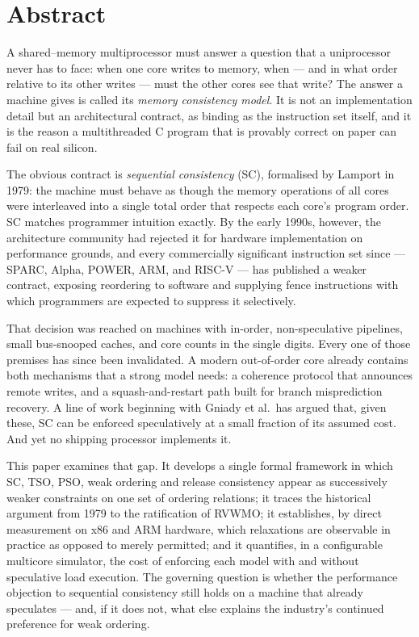 \chapter*{Abstract}

A shared--memory multiprocessor must answer a question that a uniprocessor never
has to face: when one core writes to memory, when --- and in what order relative
to its other writes --- must the other cores see that write?
The answer a machine
gives is called its \emph{memory consistency model}.
It is not an implementation
detail but an architectural contract, as binding as the instruction set itself,
and it is the reason a multithreaded C program that is provably correct on paper
can fail on real silicon.

The obvious contract is \emph{sequential consistency} (SC), formalised by Lamport
in 1979: the machine must behave as though the memory operations of all cores were
interleaved into a single total order that respects each core's program order.
SC matches programmer intuition exactly.
By the early 1990s, however, the
architecture community had rejected it for hardware implementation on performance
grounds, and every commercially significant instruction set since --- SPARC, Alpha,
POWER, ARM, and RISC-V --- has published a weaker contract, exposing reordering to
software and supplying fence instructions with which programmers are expected to
suppress it selectively.

That decision was reached on machines with in-order, non-speculative pipelines,
small bus-snooped caches, and core counts in the single digits.
Every one of those
premises has since been invalidated. A modern out-of-order core already contains
both mechanisms that a strong model needs: a coherence protocol that announces
remote writes, and a squash-and-restart path built for branch misprediction
recovery.
A line of work beginning with Gniady et al.\ has argued that, given
these, SC can be enforced speculatively at a small fraction of its assumed cost.
And yet no shipping processor implements it.

This paper examines that gap. It develops a single formal framework in which SC,
TSO, PSO, weak ordering and release consistency appear as successively weaker
constraints on one set of ordering relations; it traces the historical argument
from 1979 to the ratification of RVWMO; it establishes, by direct measurement on
x86 and ARM hardware, which relaxations are observable in practice as opposed to
merely permitted; and it quantifies, in a configurable multicore simulator, the
cost of enforcing each model with and without speculative load execution.
The
governing question is whether the performance objection to sequential consistency
still holds on a machine that already speculates --- and, if it does not, what
else explains the industry's continued preference for weak ordering.

